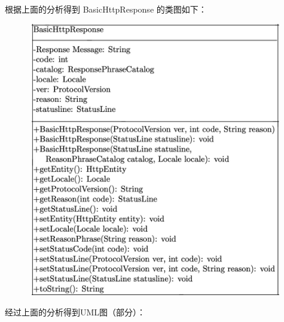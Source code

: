\documentclass{article}
\begin{document}
	\begin{CJK}{UTF8}{gbsn}
		\noindent 根据上面的分析得到 BasicHttpResponse 的类图如下：
	\end{CJK}{}
	\begin{figure}[H]
		\centering
		\includegraphics[height = 12cm, width = 12cm]{pics/32_BasicHttpResponse_UML.JPG}	
	\end{figure}
	\clearpage
	\begin{CJK}{UTF8}{gbsn}
		\noindent 经过上面的分析得到UML图（部分）：
	\end{CJK}{}
\end{document}
